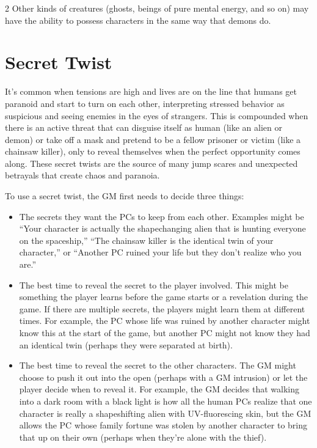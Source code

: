 \begin{multicols}{2}
Other kinds of creatures (ghosts, beings of pure mental energy, and so on) may have the ability to possess characters in the same way that demons do.

\section{Secret Twist}

It’s common when tensions are high and lives are on the line that humans get paranoid and start to turn on each other, interpreting stressed behavior as suspicious and seeing enemies in the eyes of strangers. This is compounded when there is an active threat that can disguise itself as human (like an alien or demon) or take off a mask and pretend to be a fellow prisoner or victim (like a chainsaw killer), only to reveal themselves when the perfect opportunity comes along. These secret twists are the source of many jump scares and unexpected betrayals that create chaos and paranoia.

To use a secret twist, the GM first needs to decide three things:

\begin{itemize} 
\item The secrets they want the PCs to keep from each other. Examples might be “Your character is actually the shapechanging alien that is hunting everyone on the spaceship,” “The chainsaw killer is the identical twin of your character,” or “Another PC ruined your life but they don’t realize who you are.”
\item The best time to reveal the secret to the player involved. This might be something the player learns before the game starts or a revelation during the game. If there are multiple secrets, the players might learn them at different times. For example, the PC whose life was ruined by another character might know this at the start of the game, but another PC might not know they had an identical twin (perhaps they were separated at birth).
\item The best time to reveal the secret to the other characters. The GM might choose to push it out into the open (perhaps with a GM intrusion) or let the player decide when to reveal it. For example, the GM decides that walking into a dark room with a black light is how all the human PCs realize that one character is really a shapeshifting alien with UV-fluorescing skin, but the GM allows the PC whose family fortune was stolen by another character to bring that up on their own (perhaps when they’re alone with the thief).
\end{itemize} 


\end{multicols}
